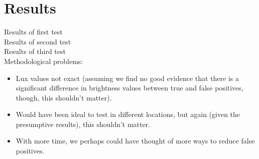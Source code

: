 \documentclass[11pt, twocolumn]{article}
\begin{document}
\section{Results}

\indent Results of first test \\
\indent Results of second test \\
\indent Results of third test \\
Methodological problems:
\begin{itemize}
\item Lux values not exact (assuming we find no good evidence that there is a significant difference in brightness values between true and false positives, though, this shouldn't matter).
\item Would have been ideal to test in different locations, but again (given the presumptive results), this shouldn't matter.
\item With more time, we perhaps could have thought of more ways to reduce false positives.
\end{itemize}
\end{document}
